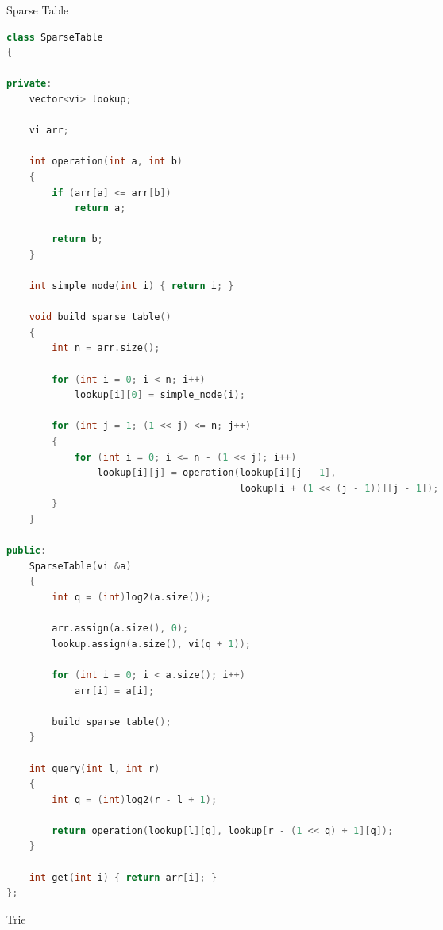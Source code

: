 \documentclass[leter]{amsart}
\begin{document}
Sparse Table
\begin{multicols}{2}
\begin{lstlisting}[language=C++]
class SparseTable
{

private:
    vector<vi> lookup;

    vi arr;

    int operation(int a, int b)
    {
        if (arr[a] <= arr[b])
            return a;

        return b;
    }

    int simple_node(int i) { return i; }

    void build_sparse_table()
    {
        int n = arr.size();

        for (int i = 0; i < n; i++)
            lookup[i][0] = simple_node(i);

        for (int j = 1; (1 << j) <= n; j++)
        {
            for (int i = 0; i <= n - (1 << j); i++)
                lookup[i][j] = operation(lookup[i][j - 1],
                                         lookup[i + (1 << (j - 1))][j - 1]);
        }
    }

public:
    SparseTable(vi &a)
    {
        int q = (int)log2(a.size());

        arr.assign(a.size(), 0);
        lookup.assign(a.size(), vi(q + 1));

        for (int i = 0; i < a.size(); i++)
            arr[i] = a[i];

        build_sparse_table();
    }

    int query(int l, int r)
    {
        int q = (int)log2(r - l + 1);

        return operation(lookup[l][q], lookup[r - (1 << q) + 1][q]);
    }

    int get(int i) { return arr[i]; }
};

\end{lstlisting}
\end{multicols}
Trie
\end{document}
